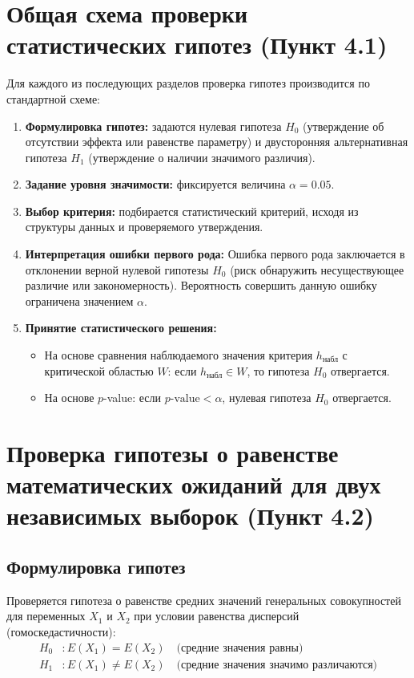 \documentclass[12pt,a4paper]{article}
\begin{document}
\section{Общая схема проверки статистических гипотез (Пункт 4.1)}
Для каждого из последующих разделов проверка гипотез производится по стандартной схеме:
\begin{enumerate}
    \item \textbf{Формулировка гипотез:} задаются нулевая гипотеза $H_0$ (утверждение об отсутствии эффекта или равенстве параметру) и двусторонняя альтернативная гипотеза $H_1$ (утверждение о наличии значимого различия).
    \item \textbf{Задание уровня значимости:} фиксируется величина $\alpha = 0.05$.
    \item \textbf{Выбор критерия:} подбирается статистический критерий, исходя из структуры данных и проверяемого утверждения.
    \item \textbf{Интерпретация ошибки первого рода:} Ошибка первого рода заключается в отклонении верной нулевой гипотезы $H_0$ (риск обнаружить несуществующее различие или закономерность). Вероятность совершить данную ошибку ограничена значением $\alpha$.
    \item \textbf{Принятие статистического решения:} 
    \begin{itemize}
        \item На основе сравнения наблюдаемого значения критерия $h_{\text{набл}}$ с критической областью $W$: если $h_{\text{набл}} \in W$, то гипотеза $H_0$ отвергается.
        \item На основе $p$-value: если $p\text{-value} < \alpha$, нулевая гипотеза $H_0$ отвергается.
    \end{itemize}
\end{enumerate}

\section{Проверка гипотезы о равенстве математических ожиданий для двух независимых выборок (Пункт 4.2)}

\subsection{Формулировка гипотез}
Проверяется гипотеза о равенстве средних значений генеральных совокупностей для переменных $X_1$ и $X_2$ при условии равенства дисперсий (гомоскедастичности):
\begin{align*}
    H_0 &: E(X_1) = E(X_2) \quad \text{(средние значения равны)} \\
    H_1 &: E(X_1) \neq E(X_2) \quad \text{(средние значения значимо различаются)}
\end{align*}
\end{document}
